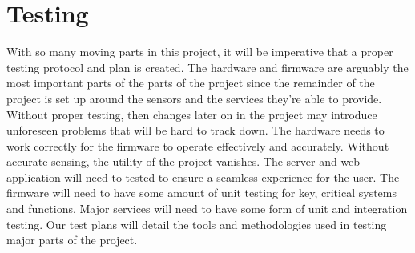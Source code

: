 \section{Testing}
With so many moving parts in this project, it will be imperative that a proper
testing protocol and plan is created. The hardware and firmware are arguably the
most important parts of the parts of the project since the remainder of the
project is set up around the sensors and the services they're able to provide.
Without proper testing, then changes later on in the project may introduce
unforeseen problems that will be hard to track down. The hardware needs to work
correctly for the firmware to operate effectively and accurately. Without
accurate sensing, the utility of the project vanishes. The server and web
application will need to tested to ensure a seamless experience for the user.
The firmware will need to have some amount of unit testing for key, critical
systems and functions. Major services will need to have some form of unit and
integration testing. Our test plans will detail the tools and methodologies used
in testing major parts of the project.

